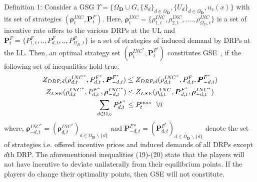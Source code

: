 \documentclass[journal]{IEEEtran}
\begin{document}
Definition 1: Consider a GSG $\Upsilon  = \{ {\Omega _\textbf{D}} \cup G,{\{ {S_d}\} _{d \in {\Omega _\textbf{D}}}},{\{ {U_d}\} _{d \in {\Omega _\textbf{D}}}},u_{c}(x)\}$ with its set of strategies $(\boldsymbol{\rho} _t^{INC },\boldsymbol{P}_t^{F})$. Here, $\boldsymbol{\rho} _t^{INC} = \{ \rho _{1,t}^{INC},\rho _{2,t}^{INC},....,\rho _{{\Omega _D},t}^{INC}\} $ is a set of incentive rate offers to the various DRPs at the UL and  $\boldsymbol{P}_t^{F} = \{ P_{1,t}^{F},..,P_{d,t}^{F},..,P_{{\Omega _D},t}^{F}\}$ is a set of strategies of induced demand by DRPs at the LL. Then, an optimal strategy set $(\boldsymbol{\rho} _t^{INC ^{*} },\boldsymbol{P}_t^{F^{ *} })$  constitutes GSE~\mbox{\cite{tushar2012economics,pang2005quasi,facchinei2007generalized,su2004sequential}}, if the following set of inequalities hold true. 
\begin{gather}
{Z_{DRP,d}}(\rho _{d,t}^{INC ^{*} },P_{d,t}^{F ^{*} },\boldsymbol{P}_{ - d,t}^{F^{*}}) \le {Z_{DRP,d}}(\rho _{d,t}^{INC^{*}},P_{d,t}^F,\boldsymbol{P}_{ - d,t}^{F^{*}}){\rm{     }}\\
{Z_{LSE}}(\rho _{d,t}^{INC^ {*} },P_{d,t}^{F ^{*} },\boldsymbol{\rho} _{ - d,t}^{INC^{*}}) \le {Z_{LSE}}(\rho _{d,t}^{INC},\boldsymbol{P}_{d,t}^{F ^{*} },\boldsymbol{\rho} _{ - d,t}^{INC^{*}}){\rm{    }}\\
\sum\limits_{d \in {\Omega _D}} {P_{d,t}^{F^{*}}}  \le P_{t}^{\max }~~\forall t
\end{gather}
where, $\boldsymbol{\rho} _{ - d,t}^{INC ^{*} } = {(\boldsymbol{\rho} _{d,t}^{INC^{ *} })_{d \in {\Omega _\textbf{D}}\backslash \{ d\} }}$ and $\boldsymbol{P}_{ - d,t}^{F * } = {(\boldsymbol{P}_{d,t}^{F ^{*} })_{d \in {\Omega _\textbf{D}}\backslash \{ d\} }}$   denote the set of strategies i.e. offered incentive prices and induced demands of all DRPs except $d$th DRP. The aforementioned inequalities (19)-(20) state that the players will not have incentive to deviate unilaterally from their equilibrium points. If the players do change their optimality points, then GSE will not constitute.    
\end{document}
